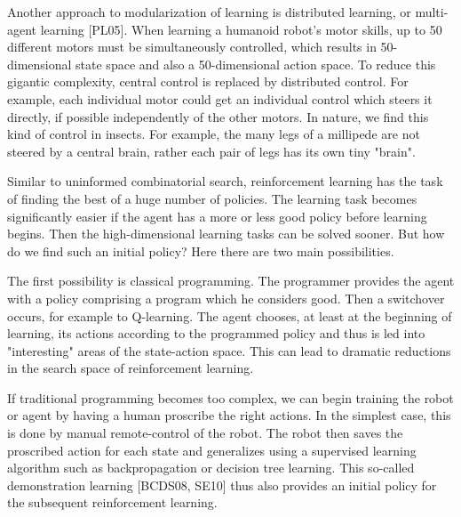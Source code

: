\documentclass[10pt]{book}
\begin{document}
\begin{center}
\begin{enumerate}
\begin{center}
\begin{center}
\begin{center}
\begin{center}
\begin{center}
Another approach to modularization of learning is distributed learning, or multi-agent learning [PL05]. When learning a humanoid robot's motor skills, up to 50 different motors must be simultaneously controlled, which results in 50-dimensional state space and also a 50-dimensional action space. To reduce this gigantic complexity, central control is replaced by distributed control. For example, each individual motor could get an individual control which steers it directly, if possible independently of the other motors. In nature, we find this kind of control in insects. For example, the many legs of a millipede are not steered by a central brain, rather each pair of legs has its own tiny "brain".

Similar to uninformed combinatorial search, reinforcement learning has the task of finding the best of a huge number of policies. The learning task becomes significantly easier if the agent has a more or less good policy before learning begins. Then the high-dimensional learning tasks can be solved sooner. But how do we find such an initial policy? Here there are two main possibilities.

The first possibility is classical programming. The programmer provides the agent with a policy comprising a program which he considers good. Then a switchover occurs, for example to Q-learning. The agent chooses, at least at the beginning of learning, its actions according to the programmed policy and thus is led into "interesting" areas of the state-action space. This can lead to dramatic reductions in the search space of reinforcement learning.

If traditional programming becomes too complex, we can begin training the robot or agent by having a human proscribe the right actions. In the simplest case, this is done by manual remote-control of the robot. The robot then saves the proscribed action for each state and generalizes using a supervised learning algorithm such as backpropagation or decision tree learning. This so-called demonstration learning [BCDS08, SE10] thus also provides an initial policy for the subsequent reinforcement learning.


\end{center}
\end{center}
\end{center}
\end{center}
\end{center}
\end{enumerate}
\end{center}
\end{document}
